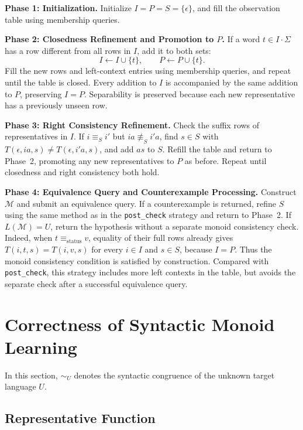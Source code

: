 \documentclass{ieice-tecrep}
\begin{document}
\textbf{Phase 1: Initialization.}
Initialize \(I=P=S=\{\epsilon\}\), and fill the observation table
using membership queries.

\textbf{Phase 2: Closedness Refinement and Promotion to \(P\).}
If a word \(t\in I\cdot\Sigma\) has a row different from all rows
in \(I\), add it to both sets:
\[
I\leftarrow I\cup\{t\},\qquad P\leftarrow P\cup\{t\}.
\]
Fill the new rows and left-context entries using membership queries,
and repeat until the table is closed. Every addition to \(I\) is
accompanied by the same addition to \(P\), preserving \(I = P\).
Separability is preserved because each new representative has a
previously unseen row.

\textbf{Phase 3: Right Consistency Refinement.}
Check the suffix rows of representatives in \(I\). If
\(i\equiv_S i'\) but \(ia\not\equiv_S i'a\), find \(s\in S\)
with \(T(\epsilon,ia,s)\neq T(\epsilon,i'a,s)\), and add \(as\)
to \(S\). Refill the table and return to Phase~2, promoting any new
representatives to \(P\) as before. Repeat until closedness and right
consistency both hold.

\textbf{Phase 4: Equivalence Query and Counterexample Processing.}
Construct \(\mathcal{M}\) and submit an equivalence query. If a
counterexample is returned, refine \(S\) using the same method as in
the \texttt{post\_check} strategy and return to Phase~2. If
\(L(\mathcal{M})=U\), return the hypothesis without a separate monoid
consistency check.
Indeed, when \(t\equiv_{\mathrm{status}}v\), equality of their full
rows already gives \(T(i,t,s)=T(i,v,s)\) for
every \(i\in I\) and \(s\in S\), because \(I=P\).
Thus the monoid consistency condition is satisfied by construction.
Compared with \texttt{post\_check}, this strategy includes more left
contexts in the table, but avoids the separate check after a successful
equivalence query.

\section{Correctness of Syntactic Monoid Learning}\label{main-results}

In this section, \(\sim_U\) denotes the syntactic congruence of the
unknown target language \(U\).

\subsection{Representative Function}\label{definition-representative-function}
\end{document}
